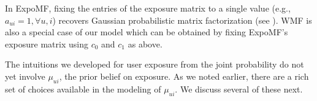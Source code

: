 In ExpoMF, fixing the entries of the exposure matrix to a single value
(e.g., $a_{ui}=1, \forall u, i$) recovers Gaussian probabilistic matrix
factorization \cite{mnih2007probabilistic} (see ). WMF is also a special case of
our model which can be obtained by fixing ExpoMF's exposure matrix using
$c_0$ and $c_1$ as above.

The intuitions we developed for 
user exposure from the joint probability 
do not yet involve $\mu_{ui}$, 
the prior belief on exposure. 
As we noted earlier, 
there are a rich set of choices 
available in the modeling of $\mu_{ui}$. 
We discuss several of these next.


